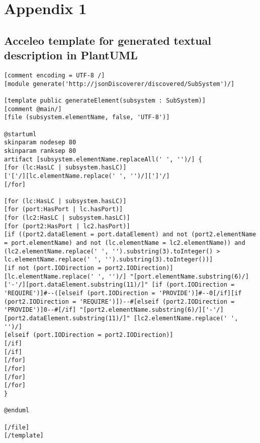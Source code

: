 \chapter{Appendix 1}
\label{app1}
\section{Acceleo template for generated textual description in PlantUML}
\begin{lstlisting}[caption=Acceleo template for generated textual description in PlantUML lanauge,label=code:acceleo_template]
[comment encoding = UTF-8 /]
[module generate('http://jsonDiscoverer/discovered/SubSystem')/]

[template public generateElement(subsystem : SubSystem)]
[comment @main/]
[file (subsystem.elementName, false, 'UTF-8')]

@startuml
skinparam nodesep 80
skinparam ranksep 80
artifact [subsystem.elementName.replaceAll(' ', '')/] {
[for (lc:HasLC | subsystem.hasLC)]
['['/][lc.elementName.replace(' ', '')/][']'/]
[/for]

[for (lc:HasLC | subsystem.hasLC)]
[for (port:HasPort | lc.hasPort)]
[for (lc2:HasLC | subsystem.hasLC)]
[for (port2:HasPort | lc2.hasPort)]
[if ((port2.dataElement = port.dataElement) and not (port2.elementName = port.elementName) and not (lc.elementName = lc2.elementName)) and (lc2.elementName.replace(' ', '').substring(3).toInteger() > lc.elementName.replace(' ', '').substring(3).toInteger())]
[if not (port.IODirection = port2.IODirection)]
[lc.elementName.replace(' ', '')/] "[port.elementName.substring(6)/]['-'/][port.dataElement.substring(11)/]" [if (port.IODirection = 'REQUIRE')]#--([elseif (port.IODirection = 'PROVIDE')]#--0[/if][if (port2.IODirection = 'REQUIRE')])--#[elseif (port2.IODirection = 'PROVIDE')]0--#[/if] "[port2.elementName.substring(6)/]['-'/][port2.dataElement.substring(11)/]" [lc2.elementName.replace(' ', '')/]
[elseif (port.IODirection = port2.IODirection)]
[/if]
[/if]
[/for]
[/for]
[/for]
[/for]
}

@enduml

[/file]
[/template]
\end{lstlisting}
